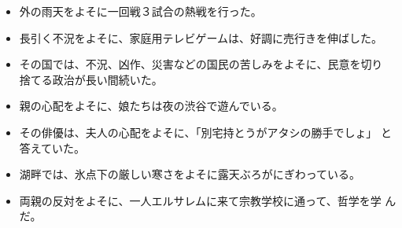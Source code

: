 \documentclass[
uplatex,
b5paper,
10pt,
dvipdfmx
]{jsbook}
\begin{document}
\begin{enumerate}
\begin{itemize}
\item 外の雨天をよそに一回戦３試合の熱戦を行った。
\item 長引く不況をよそに、家庭用テレビゲームは、好調に売行きを伸ばした。
\item その国では、不況、凶作、災害などの国民の苦しみをよそに、民意を切り
      捨てる政治が長い間続いた。
\item 親の心配をよそに、娘たちは夜の渋谷で遊んでいる。
\item その俳優は、夫人の心配をよそに、「別宅持とうがアタシの勝手でしょ」
      と答えていた。
\item 湖畔では、氷点下の厳しい寒さをよそに露天ぶろがにぎわっている。
\item 両親の反対をよそに、一人エルサレムに来て宗教学校に通って、哲学を学
      んだ。
\end{itemize}
\end{enumerate}
\end{document}
